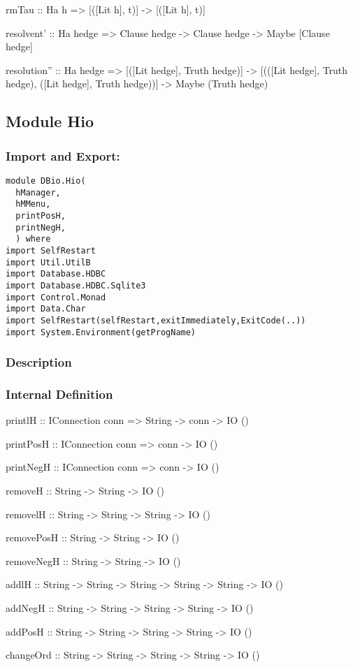 \documentclass[../gr-final.tex]{subfiles}
\begin{document}
rmTau :: Ha h => [([Lit h], t)] -> [([Lit h], t)]

resolvent' :: Ha hedge => Clause hedge -> Clause hedge -> Maybe
[Clause hedge]

resolution'' :: Ha hedge => [([Lit hedge], Truth hedge)] ->
[(([Lit hedge], Truth hedge), ([Lit hedge], Truth hedge))] ->
Maybe (Truth hedge)

\subsection{Module Hio}
\subsubsection{Import and Export:}
\begin{lstlisting}
module DBio.Hio(
  hManager,
  hMMenu,
  printPosH,
  printNegH,
  ) where
import SelfRestart
import Util.UtilB
import Database.HDBC
import Database.HDBC.Sqlite3
import Control.Monad
import Data.Char
import SelfRestart(selfRestart,exitImmediately,ExitCode(..))
import System.Environment(getProgName)
\end{lstlisting}
\subsubsection{Description}

\subsubsection{Internal Definition}
printlH :: IConnection conn => String -> conn -> IO ()

printPosH :: IConnection conn => conn -> IO ()

printNegH :: IConnection conn => conn -> IO ()

removeH :: String -> String -> IO ()

removelH :: String -> String -> String -> IO ()

removePosH :: String -> String -> IO ()

removeNegH :: String -> String -> IO ()

addlH :: String -> String -> String -> String -> String -> IO ()

addNegH :: String -> String -> String -> String -> IO ()

addPosH :: String -> String -> String -> String -> IO ()

changeOrd :: String -> String -> String -> String -> IO ()
\end{document}
